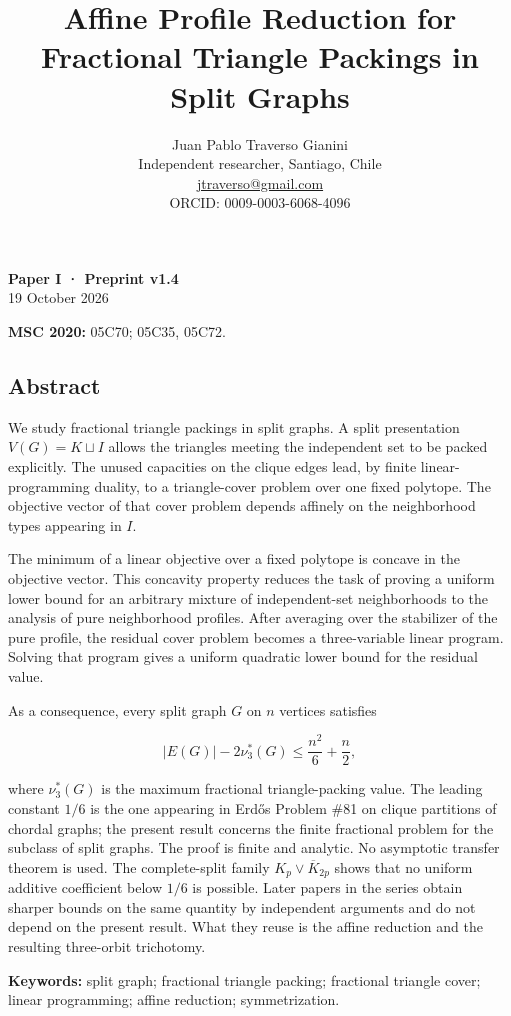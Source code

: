 \documentclass[english,11pt,a4paper]{article}
\title{Affine Profile Reduction for Fractional Triangle Packings in Split Graphs}
\author{Juan Pablo Traverso Gianini\\\small Independent researcher, Santiago, Chile\\\small \href{mailto:jtraverso@gmail.com}{jtraverso@gmail.com}\\\small ORCID: 0009-0003-6068-4096}
\date{}
\begin{document}
\raggedbottom
\maketitle
\textbf{Paper I · Preprint v1.4}\\
19 October 2026

\textbf{MSC 2020:} 05C70; 05C35, 05C72.

\subsection{Abstract}\label{abstract}

We study fractional triangle packings in split graphs. A split
presentation \(V(G)=K\sqcup I\) allows the triangles meeting the
independent set to be packed explicitly. The unused capacities on the
clique edges lead, by finite linear-programming duality, to a
triangle-cover problem over one fixed polytope. The objective vector of
that cover problem depends affinely on the neighborhood types appearing
in \(I\).

The minimum of a linear objective over a fixed polytope is concave in
the objective vector. This concavity property reduces the task of
proving a uniform lower bound for an arbitrary mixture of
independent-set neighborhoods to the analysis of pure neighborhood
profiles. After averaging over the stabilizer of the pure profile, the
residual cover problem becomes a three-variable linear program. Solving
that program gives a uniform quadratic lower bound for the residual
value.

As a consequence, every split graph \(G\) on \(n\) vertices satisfies

\[
\boxed{
|E(G)|-2\nu_3^*(G)\le \frac{n^2}{6}+\frac{n}{2}
},
\]

where \(\nu_3^*(G)\) is the maximum fractional triangle-packing value.
The leading constant \(1/6\) is the one appearing in Erdős Problem \#81
on clique partitions of chordal graphs; the present result concerns the
finite fractional problem for the subclass of split graphs. The proof is
finite and analytic. No asymptotic transfer theorem is used. The
complete-split family \(K_p\vee\overline{K}_{2p}\) shows that no uniform
additive coefficient below \(1/6\) is possible. Later papers in the
series obtain sharper bounds on the same quantity by independent
arguments and do not depend on the present result. What they reuse is
the affine reduction and the resulting three-orbit trichotomy.

\textbf{Keywords:} split graph; fractional triangle packing; fractional
triangle cover; linear programming; affine reduction; symmetrization.
\end{document}
